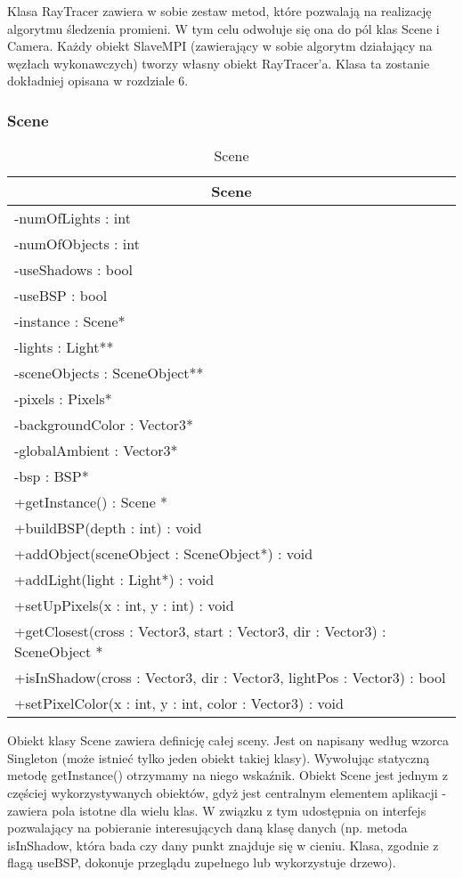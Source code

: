 Klasa RayTracer zawiera w sobie zestaw metod, które pozwalają na realizację algorytmu śledzenia promieni. W tym celu odwołuje się ona do pól klas Scene i Camera. Każdy obiekt SlaveMPI (zawierający w sobie algorytm działający na węzłach wykonawczych) tworzy własny obiekt RayTracer'a. Klasa ta zostanie dokładniej opisana w rozdziale 6.

\subsubsection{Scene}

\footnotesize
\begin{longtable}{|p{14cm}|}
    \caption{Scene} \label{tab:Scene} \\ \hline
    \multicolumn{1}{|c|}{Scene} \\ \hline
    -numOfLights : int \\
    -numOfObjects : int \\
    -useShadows : bool \\
    -useBSP : bool \\
    -instance : Scene* \\
    -lights : Light** \\
    -sceneObjects : SceneObject** \\
    -pixels : Pixels* \\
    -backgroundColor : Vector3* \\
    -globalAmbient : Vector3* \\
    -bsp : BSP* \\
    \hline
	+getInstance() : Scene * \\
	+buildBSP(depth : int) : void \\
	+addObject(sceneObject : SceneObject*) : void \\
	+addLight(light : Light*) : void \\
	+setUpPixels(x : int, y : int) : void \\
	+getClosest(cross : Vector3, start : Vector3, dir : Vector3) : SceneObject * \\
	+isInShadow(cross : Vector3, dir : Vector3, lightPos : Vector3) : bool \\
	+setPixelColor(x : int, y : int, color : Vector3) : void \\
	\hline
\end{longtable}
\normalsize

Obiekt klasy Scene zawiera definicję całej sceny. Jest on napisany według wzorca Singleton (może istnieć tylko jeden obiekt takiej klasy). Wywołując statyczną metodę getInstance() otrzymamy na niego wskaźnik. Obiekt Scene jest jednym z częściej wykorzystywanych obiektów, gdyż jest centralnym elementem aplikacji - zawiera pola istotne dla wielu klas. W związku z tym udostępnia on interfejs pozwalający na pobieranie interesujących daną klasę danych (np. metoda isInShadow, która bada czy dany punkt znajduje się w cieniu. Klasa, zgodnie z flagą useBSP, dokonuje przeglądu zupełnego lub wykorzystuje drzewo).

